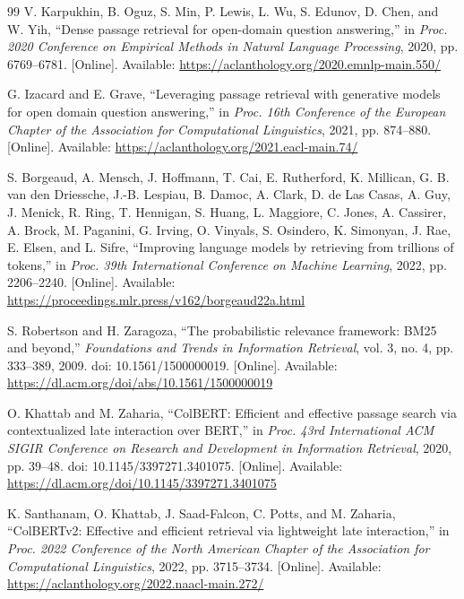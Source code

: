 \begin{thebibliography}{99}
V. Karpukhin, B. Oguz, S. Min, P. Lewis, L. Wu, S. Edunov, D. Chen, and W. Yih,
``Dense passage retrieval for open-domain question answering,''
in \textit{Proc. 2020 Conference on Empirical Methods in Natural Language Processing}, 2020, pp. 6769--6781.
[Online]. Available: \url{https://aclanthology.org/2020.emnlp-main.550/}

G. Izacard and E. Grave,
``Leveraging passage retrieval with generative models for open domain question answering,''
in \textit{Proc. 16th Conference of the European Chapter of the Association for Computational Linguistics}, 2021, pp. 874--880.
[Online]. Available: \url{https://aclanthology.org/2021.eacl-main.74/}

S. Borgeaud, A. Mensch, J. Hoffmann, T. Cai, E. Rutherford, K. Millican, G. B. van den Driessche, J.-B. Lespiau, B. Damoc, A. Clark, D. de Las Casas, A. Guy, J. Menick, R. Ring, T. Hennigan, S. Huang, L. Maggiore, C. Jones, A. Cassirer, A. Brock, M. Paganini, G. Irving, O. Vinyals, S. Osindero, K. Simonyan, J. Rae, E. Elsen, and L. Sifre,
``Improving language models by retrieving from trillions of tokens,''
in \textit{Proc. 39th International Conference on Machine Learning}, 2022, pp. 2206--2240.
[Online]. Available: \url{https://proceedings.mlr.press/v162/borgeaud22a.html}

S. Robertson and H. Zaragoza,
``The probabilistic relevance framework: BM25 and beyond,''
\textit{Foundations and Trends in Information Retrieval}, vol. 3, no. 4, pp. 333--389, 2009.
doi: 10.1561/1500000019.
[Online]. Available: \url{https://dl.acm.org/doi/abs/10.1561/1500000019}

O. Khattab and M. Zaharia,
``ColBERT: Efficient and effective passage search via contextualized late interaction over BERT,''
in \textit{Proc. 43rd International ACM SIGIR Conference on Research and Development in Information Retrieval}, 2020, pp. 39--48.
doi: 10.1145/3397271.3401075.
[Online]. Available: \url{https://dl.acm.org/doi/10.1145/3397271.3401075}

K. Santhanam, O. Khattab, J. Saad-Falcon, C. Potts, and M. Zaharia,
``ColBERTv2: Effective and efficient retrieval via lightweight late interaction,''
in \textit{Proc. 2022 Conference of the North American Chapter of the Association for Computational Linguistics}, 2022, pp. 3715--3734.
[Online]. Available: \url{https://aclanthology.org/2022.naacl-main.272/}


\end{thebibliography}
